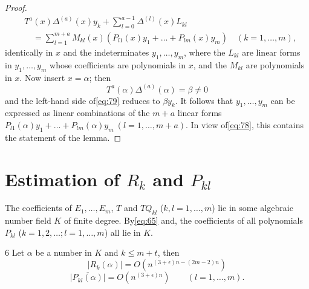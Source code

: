 \begin{proof}
\begin{equation}
\begin{aligned}
& T^{a}(x) \Delta^{(a)}(x)y_{k} + \sum_{l=0}^{a-1} \Delta^{(l)}(x)L_{kl} \\
& \quad = \sum_{l=1}^{m+a} M_{kl}(x) \left(P_{l1}(x)y_{1} + \dots + P_{lm}(x)y_{m}\right) \quad (k=1,\dots,m),
\end{aligned}
\tag{79}\label{eq:79}
\end{equation}
identically in $x$ and the indeterminates $y_1, \dots, y_m$, where the $L_{kl}$ are linear forms in $y_1, \dots, y_m$ whose coefficients are polynomials in $x$, and the $M_{kl}$ are polynomials in $x$. Now insert $x = \alpha$; then
\[T^{a}(\alpha) \Delta^{(a)}(\alpha) = \beta \neq 0\]
and the left-hand side of\eqref{eq:79} reduces to $\beta y_k$. It follows that $y_1, \dots, y_m$ can be expressed as linear combinations of the $m+a$ linear forms $P_{l1}(\alpha)y_1 + \dots + P_{lm}(\alpha)y_m \ (l = 1, \dots, m+a)$. In view of\eqref{eq:78}, this contains the statement of the lemma.
\end{proof}

\section{Estimation of $R_k$ and $P_{kl}$}

The coefficients of $E_1, \dots, E_m$, $T$ and $T Q_{kl}$ ($k, l = 1, \dots, m$) lie in some algebraic number field $K$ of finite degree. By\eqref{eq:65} and, the coefficients of all polynomials $P_{kl}$ ($k=1, 2, \dots; l=1, \dots, m$) all lie in $K$.

\begin{mylemma}{}{6}
Let $\alpha$ be a number in $K$ and $k \le m+t$, then
\[|R_{k}(\alpha)| = O \left(n^{(3+\epsilon)n - (2m-2)n}\right)\]
\[\overline{|P_{kl}(\alpha)|} = O \left(n^{(3+\epsilon)n}\right) \qquad (l=1,\dots,m).\]
\end{mylemma}

